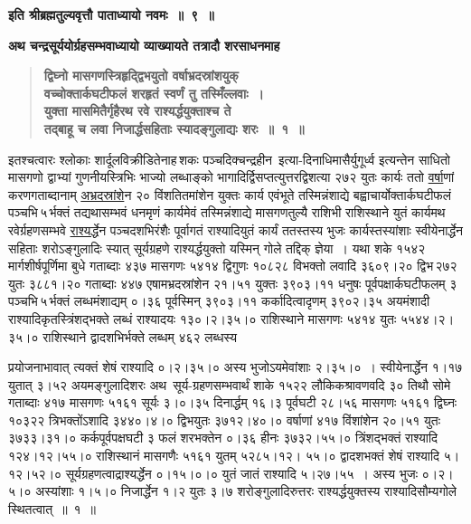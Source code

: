 \documentclass[11pt, openany]{book}
\begin{document}
\begin{center}
{\large \textbf{इति श्रीब्रह्मतुल्यवृत्तौ पाताध्यायो नवमः~॥~९~॥}}
\end{center}
\vspace{2mm}

{\small \textbf{अथ चन्द्रसूर्ययोर्ग्रहसम्भवाध्यायो व्याख्यायते तत्रादौ
शरसाधनमाह\textendash }}

 \label{10.1}
\begin{quote}
{\large \textbf{{\color{purple}द्विघ्नो मासगणस्त्रिहृद्द्विभयुतो वर्षाभ्रदस्रांशयुक् \\
वच्चोक्तार्कघटीफलं शरहृतं स्वर्णं तु तस्मिँल्लवाः~।\\
युक्ता मासमितैर्गृहैरथ रवे राश्यर्द्धयुक्ताश्च ते \\
तद्बाहू च लवा निजार्द्धसहिताः स्यादङ्गुलाद्यः शरः~॥~१~॥}}}
\end{quote}

\newpage

\begin{sloppypar}
इतश्चत्वारः श्लोकाः शार्दूलविक्रीडितेनाह\textendash \,शकः पञ्चदिक्चन्द्रहीन~इत्या-दिनाधिमासैर्युगूर्ध्व इत्यन्तेन साधितो मासगणो द्वाभ्यां गुणनीयस्त्रिभिः भाज्यो लब्धाङ्को भागादिर्द्विसप्तत्युत्तरद्विशत्या २७२ युतः कार्यः ततो \hyperref[10.1]{वर्षा}णां करणगताब्दानाम् \hyperref[10.1]{अभ्रदस्रांशे}न २० विंशतितमांशेन युक्तः कार्य एवंभूते तस्मिन्नंशाद्ये बह्वाचार्योक्तार्कघटीफलं पञ्चभि\textendash \,५\textendash \,र्भक्तं तद्यथासम्भवं धनमृणं कार्यमेवं तस्मिन्नंशाद्ये मासगणतुल्यै राशिभी राशिस्थाने युतं कार्यमथ रवेर्ग्रहणसम्भवे \hyperref[10.1]{राश्यर्द्धे}न पञ्चदशभिरंशैः पूर्वागतं राश्यादियुतं कार्यं ततस्तस्य भुजः कार्यस्तस्यांशाः स्वीयेनार्द्धेन सहिताः शरोऽङ्गुलादिः स्यात् सूर्यग्रहणे राश्यर्द्धयुक्तो यस्मिन् गोले तद्दिक् ज्ञेया~। यथा शके १५४२ मार्गशीर्षपूर्णिमा बुधे गताब्दाः ४३७ मासगणः ५४१४ द्विगुणः १०८२८ विभक्तो लवादि ३६०९।२० द्विभ\textendash \,२७२\textendash \,युतः ३८८१।२० गताब्दाः ४४७ एषामभ्रदस्रांशेन २१।५१ युक्तः ३९०३।११ धनुषः पूर्वपक्षार्कघटीफलम् ३ पञ्चभि\textendash \,५\textendash \,र्भक्तं लब्धमंशाद्यम् ०।३६ पूर्वस्मिन् ३९०३।११ कर्कादित्वादृणम् ३९०२।३५ अयमंशादी राश्यादिकृतस्त्रिंशद्भक्ते लब्धं राश्यादयः १३०।२।३५।० राशिस्थाने मासगणः ५४१४ युतः ५५४४।२।३५।० राशिस्थाने द्वादशभिर्भक्ते लब्धम् ४६२ लब्धस्य
\end{sloppypar}

\newpage

\begin{sloppypar}
\noindent प्रयोजनाभावात् त्यक्तं शेषं राश्यादि ०।२।३५।० अस्य भुजोऽयमेवांशाः २।३५।०~। स्वीयेनार्द्धेन १।१७ युतात् ३।५२ अयमङ्गुलादिशरः अथ~सूर्य-ग्रहणसम्भवार्थं शाके १५२२ लौकिकश्रावणवदि ३० तिथौ सोमे गताब्दाः ४१७ मासगणः ५१६१ सूर्यः ३।०।३५ दिनार्द्धम् १६।३ पूर्वघटी २८।५६ मासगणः ५१६१ द्विघ्नः १०३२२ त्रिभक्तोंऽशादि ३४४०।४।० द्विभयुतः ३७१२।४०।० वर्षाणां ४१७ विंशांशेन २०।५१ युतः ३७३३।३१।० कर्कपूर्वपक्षघटी ३ फलं शरभक्तेन ०।३६ हीनः ३७३२।५५।० त्रिंशद्भक्तं राश्यादि १२४।१२।५५।० राशिस्थानं मासगणैः ५१६१ युतम् ५२८५।१२। ५५।० द्वादशभक्तं शेषं राश्यादि ५।१२।५२।० सूर्यग्रहणत्वाद्राश्यर्द्धेन ०।१५।०।० युतं जातं राश्यादि ५।२७।५५~। अस्य भुजः ०।२।५।० अस्यांशाः १।५।० निजार्द्धेन १।२ युतः ३।७ शरोङ्गुलादिरुत्तरः राश्यर्द्धयुक्तस्य राश्यादिसौम्यगोले स्थितत्वात्~॥~१~॥\\
\end{sloppypar}
\end{document}
